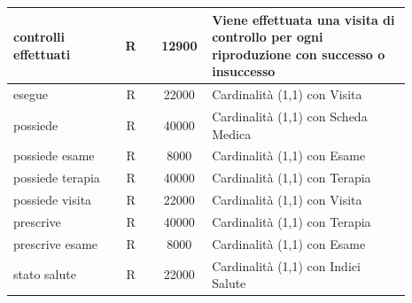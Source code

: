 \documentclass[12pt,a4paper]{article}
\begin{document}
\begin{center}
\begin{longtable}{|p{0.23\linewidth}|p{0.1\linewidth}|p{0.11\linewidth}|p{0.45\linewidth}|}
\hline
controlli effettuati
 & 
\multicolumn{1}{|c|}{R}
 & 
\multicolumn{1}{|c|}{12900}
 & 
Viene effettuata una visita di controllo per ogni riproduzione con successo o insuccesso  
\\

\hline
esegue
 & 
\multicolumn{1}{|c|}{R}
 & 
\multicolumn{1}{|c|}{22000}
 & 
Cardinalità (1,1) con Visita
\\

\hline
possiede
 & 
\multicolumn{1}{|c|}{R}
 & 
\multicolumn{1}{|c|}{40000}
 & 
Cardinalità (1,1) con Scheda Medica
\\

\hline
possiede esame
 & 
\multicolumn{1}{|c|}{R}
 & 
\multicolumn{1}{|c|}{8000}
 & 
Cardinalità (1,1) con Esame
\\

\hline
possiede terapia
 & 
\multicolumn{1}{|c|}{R}
 & 
\multicolumn{1}{|c|}{40000}
 & 
Cardinalità (1,1) con Terapia
\\

\hline
possiede visita
 & 
\multicolumn{1}{|c|}{R}
 & 
\multicolumn{1}{|c|}{22000}
 & 
Cardinalità (1,1) con Visita
\\

\hline
prescrive
 & 
\multicolumn{1}{|c|}{R}
 & 
\multicolumn{1}{|c|}{40000}
 & 
Cardinalità (1,1) con Terapia
\\

\hline
prescrive esame
 & 
\multicolumn{1}{|c|}{R}
 & 
\multicolumn{1}{|c|}{8000}
 & 
Cardinalità (1,1) con Esame
\\

\hline
stato salute
 & 
\multicolumn{1}{|c|}{R}
 & 
\multicolumn{1}{|c|}{22000}
 & 
Cardinalità (1,1) con Indici Salute
\\

\hline

\end{longtable}\end{center}
\end{document}
